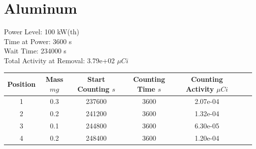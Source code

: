\newpage

\section*{ Aluminum }

Power Level: 100 kW(th) \\
Time at Power: 3600 s \\
Wait Time: 234000 s \\
Total Activity at Removal: 3.79e+02 $\mu Ci$

\begin{table}[h]
\centering
\begin{tabular}{ |c|c|c|c|c|c|c| }
 \hline
 Position & Mass $mg$ & Start Counting $s$ & Counting Time $s$ & Counting Activity $\mu Ci$ \\
 \hline 
 1 & 0.3 & 237600 & 3600 & 2.07e-04\\ 
\hline
 2 & 0.2 & 241200 & 3600 & 1.32e-04\\ 
\hline
 3 & 0.1 & 244800 & 3600 & 6.30e-05\\ 
\hline
 4 & 0.2 & 248400 & 3600 & 1.20e-04\\ 
\hline
\end{tabular}
\end{table}

